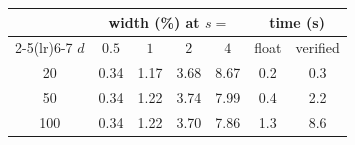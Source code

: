 \begin{tabular}{c cccc cc}
\toprule
 & \multicolumn{4}{c}{width (\%) at $s=$} & \multicolumn{2}{c}{time (s)}\\
\cmidrule(lr){2-5}\cmidrule(lr){6-7}
$d$ & $0.5$ & $1$ & $2$ & $4$ & float & verified\\
\midrule
20 & 0.34 & 1.17 & 3.68 & 8.67 & 0.2 & 0.3\\
50 & 0.34 & 1.22 & 3.74 & 7.99 & 0.4 & 2.2\\
100 & 0.34 & 1.22 & 3.70 & 7.86 & 1.3 & 8.6\\
\bottomrule
\end{tabular}